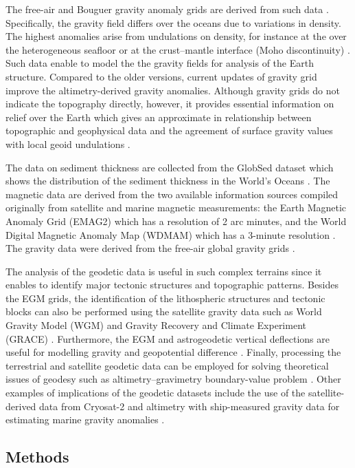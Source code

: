 \documentclass[geomatics,article,submit,pdftex,moreauthors]{Definitions/mdpi}
\begin{document}
The free-air and Bouguer gravity anomaly grids are derived from such data \cite{EGU,BRAITENBERG2021706}.
Specifically, the gravity field differs over the oceans due to variations in density. The highest anomalies arise from undulations on density, for instance at the over the heterogeneous seafloor or at the crust--mantle interface (Moho discontinuity) \cite{MCNUTT201920}. Such data enable to model the the gravity fields for analysis of the Earth structure. Compared to the older versions, current updates of gravity grid improve the altimetry-derived gravity anomalies. Although gravity grids do not indicate the topography directly, however, it provides essential information on relief over the Earth which gives an approximate in relationship between topographic and geophysical data and the agreement of surface gravity values with local geoid undulations \cite{CONDIE202281}. 

The data on sediment thickness are collected from the GlobSed dataset which shows the distribution of the sediment thickness in the World's Oceans \cite{Straume}. The magnetic data are derived from the two available information sources compiled originally from satellite and marine magnetic measurements: the Earth Magnetic Anomaly Grid (EMAG2) \cite{Maus} which has a resolution of 2 arc minutes, and the World Digital Magnetic Anomaly Map (WDMAM) which has a 3-minute resolution \cite{Lesur}. The gravity data were derived from the free-air global gravity grids \cite{Sandwell}.

The analysis of the geodetic data is useful in such complex terrains since it enables to identify major tectonic structures and topographic patterns. Besides the EGM grids, the identification of the lithospheric structures and tectonic blocks can also be performed using the satellite gravity data such as World Gravity Model (WGM) and Gravity Recovery and Climate Experiment (GRACE) \cite{EMISHAW2023104775}. Furthermore, the EGM and astrogeodetic vertical deflections are useful for modelling gravity and geopotential difference \cite{WANG2023}. Finally, processing the terrestrial and satellite geodetic data can be employed for solving theoretical issues of geodesy such as altimetry–gravimetry boundary-value problem \cite{Lehmann}. Other examples of implications of the geodetic datasets include the use of the satellite-derived data from Cryosat-2 and altimetry with ship-measured gravity data for estimating marine gravity anomalies \cite{NGUYEN2020505}.

\subsection{Methods}
\end{document}

